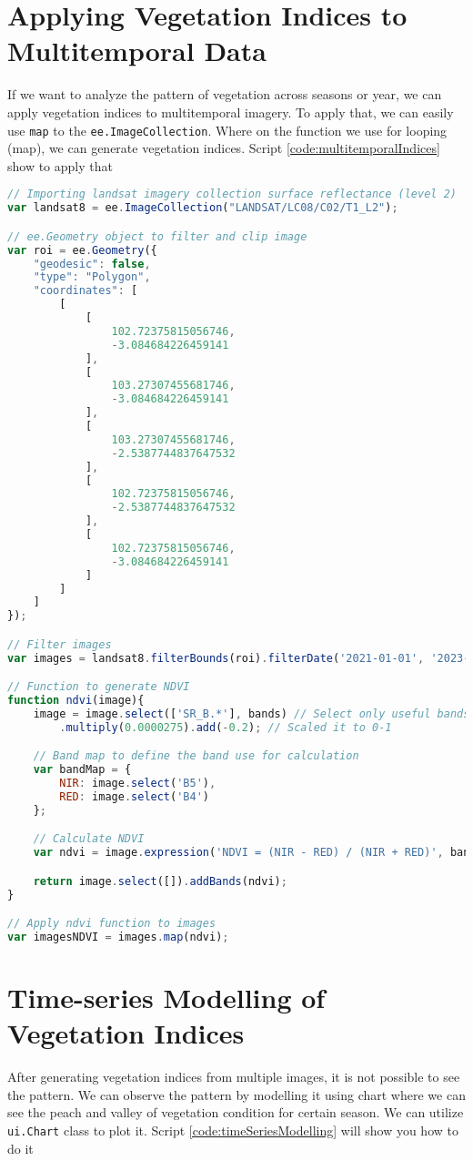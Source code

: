 \section{Applying Vegetation Indices to Multitemporal Data}
If we want to analyze the pattern of vegetation across seasons or year, we can apply vegetation indices to multitemporal imagery. To apply that, we can easily use \verb|map| to the \verb|ee.ImageCollection|. Where on the function we use for looping (map), we can generate vegetation indices. Script \ref{code:multitemporalIndices} show to apply that

\begin{lstlisting}[language=JavaScript, label={code:multitemporalIndices}, caption={GEE Script to Preprocess Multitemporal Image}]
// Importing landsat imagery collection surface reflectance (level 2)
var landsat8 = ee.ImageCollection("LANDSAT/LC08/C02/T1_L2");

// ee.Geometry object to filter and clip image
var roi = ee.Geometry({
	"geodesic": false,
	"type": "Polygon",
	"coordinates": [
		[
			[
				102.72375815056746,
				-3.084684226459141
			],
			[
				103.27307455681746,
				-3.084684226459141
			],
			[
				103.27307455681746,
				-2.5387744837647532
			],
			[
				102.72375815056746,
				-2.5387744837647532
			],
			[
				102.72375815056746,
				-3.084684226459141
			]
		]
	]
});

// Filter images
var images = landsat8.filterBounds(roi).filterDate('2021-01-01', '2023-12-31');

// Function to generate NDVI
function ndvi(image){
	image = image.select(['SR_B.*'], bands) // Select only useful bands
		.multiply(0.0000275).add(-0.2); // Scaled it to 0-1

	// Band map to define the band use for calculation
	var bandMap = {
		NIR: image.select('B5'),
		RED: image.select('B4')
	};

	// Calculate NDVI
	var ndvi = image.expression('NDVI = (NIR - RED) / (NIR + RED)', bandMap);

	return image.select([]).addBands(ndvi);
}

// Apply ndvi function to images
var imagesNDVI = images.map(ndvi);
\end{lstlisting}

\section{Time-series Modelling of Vegetation Indices}
After generating vegetation indices from multiple images, it is not possible to see the pattern. We can observe the pattern by modelling it using chart where we can see the peach and valley of vegetation condition for certain season. We can utilize \verb|ui.Chart| class to plot it. Script \ref{code:timeSeriesModelling} will show you how to do it

